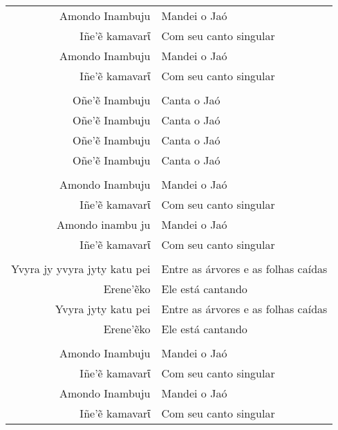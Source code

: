 \begin{itemize}
\begin{table}[]
\begin{tabular}{rl}
Amondo Inambuju          & Mandei o Jaó           \\
Iñe'ẽ kamavarῖ\footnotemark{}          & Com seu canto singular           \\
Amondo Inambuju  		& Mandei o Jaó \\
Iñe'ẽ kamavarῖ          & Com seu canto singular           \\
                  &                     \\
Oñe'ẽ Inambuju\footnotemark{}          & Canta o Jaó           \\
Oñe'ẽ Inambuju          & Canta o Jaó           \\
Oñe'ẽ Inambuju  		& Canta o Jaó \\
Oñe'ẽ Inambuju          & Canta o Jaó           \\
                  &                     \\
Amondo Inambuju          & Mandei o Jaó           \\
Iñe'ẽ kamavarῖ          & Com seu canto singular           \\
Amondo inambu ju  		& Mandei o Jaó \\
Iñe'ẽ kamavarῖ          & Com seu canto singular           \\
                  &                     \\
Yvyra jy yvyra jyty katu pei          & Entre as árvores e as folhas caídas           \\
Erene'ẽko          & Ele está cantando           \\
Yvyra jyty katu pei  		& Entre as árvores e as folhas caídas \\
Erene'ẽko          & Ele está cantando           \\
                  &                     \\
Amondo Inambuju          & Mandei o Jaó           \\
Iñe'ẽ kamavarῖ          & Com seu canto singular           \\
Amondo Inambuju  		& Mandei o Jaó \\
Iñe'ẽ kamavarῖ          & Com seu canto singular           \\
\end{tabular}
\end{table}





\end{itemize}
